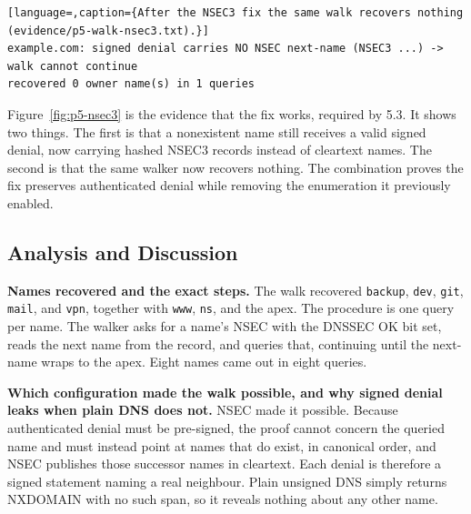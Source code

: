 \documentclass[11pt]{article}
\begin{document}
\begin{lstlisting}[language=,caption={After the NSEC3 fix the same walk recovers nothing (evidence/p5-walk-nsec3.txt).}]
example.com: signed denial carries NO NSEC next-name (NSEC3 ...) -> walk cannot continue
recovered 0 owner name(s) in 1 queries
\end{lstlisting}


Figure~\ref{fig:p5-nsec3} is the evidence that the fix works,
required by 5.3. It shows two things. The first is that a nonexistent name
still receives a valid signed denial, now carrying hashed NSEC3 records instead of
cleartext names. The second is that the same walker now recovers nothing. The
combination proves the fix preserves authenticated denial while removing the
enumeration it previously enabled.

\subsection{Analysis and Discussion}

\textbf{Names recovered and the exact steps.} The walk recovered \texttt{backup},
\texttt{dev}, \texttt{git}, \texttt{mail}, and \texttt{vpn}, together with
\texttt{www}, \texttt{ns}, and the apex. The procedure is one query per name. The
walker asks for a name's NSEC with the DNSSEC OK bit set, reads the next name from
the record, and queries that, continuing until the next-name wraps to the apex.
Eight names came out in eight queries.

\textbf{Which configuration made the walk possible, and why signed denial leaks
when plain DNS does not.} NSEC made it possible. Because authenticated denial must
be pre-signed, the proof cannot concern the queried name and must instead point at
names that do exist, in canonical order, and NSEC publishes those successor names
in cleartext. Each denial is therefore a signed statement naming a real neighbour.
Plain unsigned DNS simply returns NXDOMAIN with no such span, so it reveals nothing
about any other name.
\end{document}
